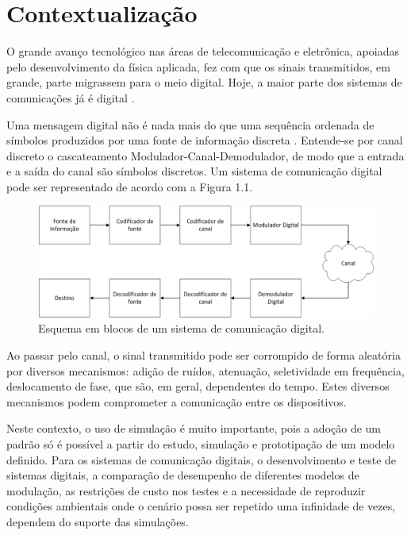 
\thispagestyle{fancy}

\section{Contextualização}
O grande avanço tecnológico nas áreas de telecomunicação e eletrônica, apoiadas pelo desenvolvimento da física aplicada, fez com que os sinais transmitidos, em grande, parte migrassem para o meio digital. Hoje, a maior parte dos sistemas de comunicações já é digital \cite{john2001digital} .

Uma mensagem digital não é nada mais do que uma sequência ordenada de símbolos produzidos por uma fonte de informação discreta \cite{carlson2002introduction}. Entende-se por canal discreto o cascateamento Modulador-Canal-Demodulador, de modo que a entrada e a saída do canal são símbolos discretos. Um sistema de comunicação digital pode ser representado de acordo com a Figura 1.1.


\begin{figure}[!ht]
\begin{center}
\includegraphics[scale=0.5]{./Figures/png/figura1.png}
\caption{Esquema em blocos de um sistema de comunicação digital.}
\label{fig:image_seq}
\end{center}
\end{figure}


Ao passar pelo canal, o sinal transmitido pode ser corrompido de forma aleatória por diversos mecanismos: adição de ruídos, atenuação, seletividade em frequência, deslocamento de fase, que são, em geral, dependentes do tempo. Estes diversos mecanismos podem comprometer a comunicação entre os dispositivos. 
 
Neste contexto, o uso de simulação é muito importante, pois a adoção de um padrão só é possível a partir do estudo, simulação e prototipação de um modelo definido. Para os sistemas de comunicação digitais, o desenvolvimento e teste de sistemas digitais, a comparação de desempenho de diferentes modelos de modulação, as restrições de custo nos testes e a necessidade de reproduzir condições ambientais onde o cenário possa ser repetido uma infinidade de vezes, dependem do suporte das simulações. 

